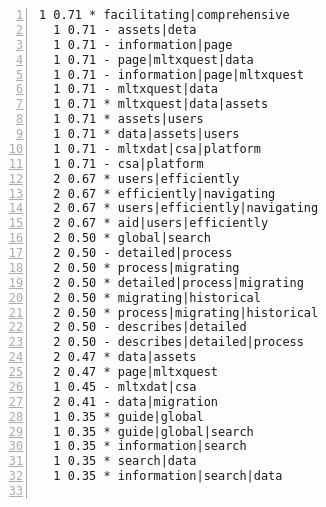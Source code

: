 \documentclass[10pt]{article}
\begin{document}
{\begin{lstlisting}[numbers=left,basicstyle=\ttfamily\footnotesize, frame=none]
  1 0.71 * facilitating|comprehensive                                    page|mltxquest
  1 0.71 - assets|deta                                                   page|mltxquest
  1 0.71 - information|page                                              page|mltxquest
  1 0.71 - page|mltxquest|data                                           page|mltxquest
  1 0.71 - information|page|mltxquest                                    page|mltxquest
  1 0.71 - mltxquest|data                                                page|mltxquest
  1 0.71 * mltxquest|data|assets                                         page|mltxquest
  1 0.71 * assets|users                                                  page|mltxquest
  1 0.71 * data|assets|users                                             page|mltxquest
  1 0.71 - mltxdat|csa|platform                                          information|assets
  1 0.71 - csa|platform                                                  information|assets
  2 0.67 * users|efficiently                                             data|assets
  2 0.67 * efficiently|navigating                                        data|assets
  2 0.67 * users|efficiently|navigating                                  data|assets
  2 0.67 * aid|users|efficiently                                         data|assets
  2 0.50 * global|search                                                 detailed
  2 0.50 - detailed|process                                              detailed
  2 0.50 * process|migrating                                             detailed
  2 0.50 * detailed|process|migrating                                    detailed
  2 0.50 * migrating|historical                                          detailed
  2 0.50 * process|migrating|historical                                  detailed
  2 0.50 - describes|detailed                                            detailed
  2 0.50 - describes|detailed|process                                    detailed
  2 0.47 * data|assets                                                   page|mltxquest
  2 0.47 * page|mltxquest                                                data|assets
  1 0.45 - mltxdat|csa                                                   information|assets
  2 0.41 - data|migration                                                detailed
  1 0.35 * guide|global                                                  detailed
  1 0.35 * guide|global|search                                           detailed
  1 0.35 * information|search                                            detailed
  1 0.35 * search|data                                                   detailed
  1 0.35 * information|search|data                                       detailed


\end{lstlisting}}
\end{document}
